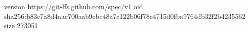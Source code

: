 version https://git-lfs.github.com/spec/v1
oid sha256:b83c7a8d4aac700aab9ebc48a7c122b06f78e4715d0fba9764db32f2b4235562
size 273051
